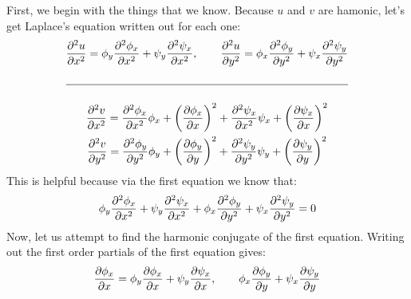 \begin{enumerate}
	\begin{problem}
		First, we begin with the things that we know. Because $u$ and $v$ are hamonic, let's get Laplace's equation written out for each one:
		\begin{gather*}
			\prtt{u}{x} = \phi_y\prtt{\phi_x}{x} + \psi_y\prtt{\psi_x}{x},\qquad \prtt{u}{y}= \phi_x\prtt{\phi_y}y + \psi_x\prtt{\psi_y}y\\\\\hline\\
			\prtt{v}{x}=\prtt{\phi_x}{x}\phi_x + \cpr{\prt{\phi_x}x}^2 + \prtt{\psi_x}{x}\psi_x + \cpr{\prt{\psi_x}x}^2\\
			\prtt{v}{y}=\prtt{\phi_y}{y}\phi_y + \cpr{\prt{\phi_y}y}^2 + \prtt{\psi_y}{y}\psi_y + \cpr{\prt{\psi_y}y}^2
		\end{gather*}
		This is helpful because via the first equation we know that:
		\begin{align*}
			\phi_y\prtt{\phi_x}{x} + \psi_y\prtt{\psi_x}{x}+ \phi_x\prtt{\phi_y}y + \psi_x\prtt{\psi_y}y = 0
		\end{align*}
		Now, let us attempt to find the harmonic conjugate of the first equation. Writing out the first order partials of the first equation gives:
		\begin{align*}
			\prt{\phi_x}{x} = \phi_y\prt{\phi_x}x + \psi_y\prt{\psi_x}x, \qquad \phi_x\prt{\phi_y}y + \psi_x\prt{\psi_y}y
		\end{align*}
	\end{problem}
\end{enumerate}




